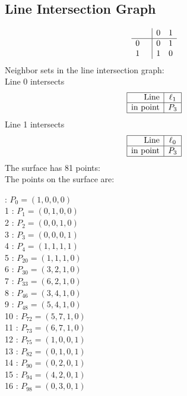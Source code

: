 \documentclass{article}
\begin{document}
{\subsection*{Line Intersection Graph}
{\arraycolsep=1pt
$$
\begin{array}{rr|*{2}r}
 &  & 0 & 1\\
\hline
0 &  & 0 & 1\\
1 &  & 1 & 0\\
\end{array}
$$
}%
Neighbor sets in the line intersection graph:\\
Line 0 intersects 
$$
\begin{array}{|r*{1}{|c}|}
\hline
\mbox{Line}  & \ell_{1}\\
\hline
\mbox{in point}  & P_{3}\\
\hline
\end{array}
$$
Line 1 intersects 
$$
\begin{array}{|r*{1}{|c}|}
\hline
\mbox{Line}  & \ell_{0}\\
\hline
\mbox{in point}  & P_{3}\\
\hline
\end{array}
$$
The surface has 81 points:\\
The points on the surface are:\\
\begin{multicols}{3}
 : $P_{0}=( 1, 0, 0, 0 )$\\
1 : $P_{1}=( 0, 1, 0, 0 )$\\
2 : $P_{2}=( 0, 0, 1, 0 )$\\
3 : $P_{3}=( 0, 0, 0, 1 )$\\
4 : $P_{4}=( 1, 1, 1, 1 )$\\
5 : $P_{20}=( 1, 1, 1, 0 )$\\
6 : $P_{30}=( 3, 2, 1, 0 )$\\
7 : $P_{33}=( 6, 2, 1, 0 )$\\
8 : $P_{46}=( 3, 4, 1, 0 )$\\
9 : $P_{48}=( 5, 4, 1, 0 )$\\
10 : $P_{72}=( 5, 7, 1, 0 )$\\
11 : $P_{73}=( 6, 7, 1, 0 )$\\
12 : $P_{75}=( 1, 0, 0, 1 )$\\
13 : $P_{82}=( 0, 1, 0, 1 )$\\
14 : $P_{90}=( 0, 2, 0, 1 )$\\
15 : $P_{94}=( 4, 2, 0, 1 )$\\
16 : $P_{98}=( 0, 3, 0, 1 )$\\

\end{multicols}}
\end{document}
